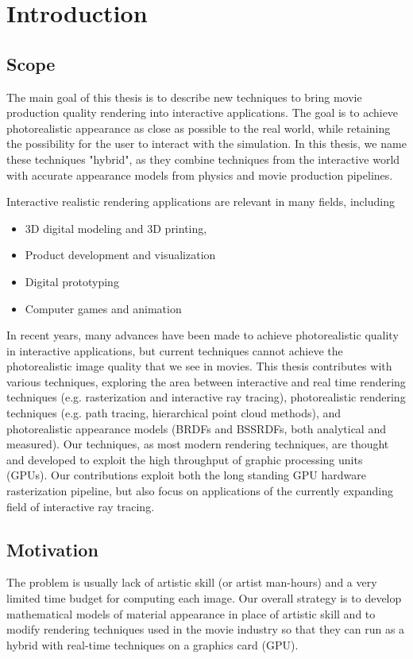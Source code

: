 \chapter{Introduction}
\label{sec:intro}
\section{Scope}
The main goal of this thesis is to describe new techniques to bring movie production quality rendering into interactive applications.  The goal is to achieve photorealistic appearance as close as possible to the real world, while retaining the possibility for the user to interact with the simulation. In this thesis, we name these techniques "hybrid", as they combine techniques from the interactive world with accurate appearance models from physics and movie production pipelines.

Interactive realistic rendering applications are relevant in many fields, including
\begin{itemize}
\item 3D digital modeling and 3D printing,
\item Product development and visualization
\item Digital prototyping
\item Computer games and animation
\end{itemize}
In recent years, many advances have been made to achieve photorealistic quality in interactive applications,  but current techniques cannot achieve the photorealistic image quality that we see in movies. This thesis contributes with various techniques, exploring the area between interactive and real time rendering techniques (e.g. rasterization and interactive ray tracing), photorealistic rendering techniques (e.g. path tracing, hierarchical point cloud methods), and photorealistic appearance models (BRDFs and BSSRDFs, both analytical and measured). Our techniques, as most modern rendering techniques, are thought and developed to exploit the high throughput of graphic processing units (GPUs). Our contributions exploit both the long standing GPU hardware rasterization pipeline, but also focus on applications of the currently expanding field of interactive ray tracing. 

\section{Motivation}

The problem is usually lack of artistic skill (or artist man-hours) and
a very limited time budget for computing each image. Our overall strategy is to develop
mathematical models of material appearance in place of artistic skill and to modify rendering
techniques used in the movie industry so that they can run as a hybrid with real-time techniques
on a graphics card (GPU).


